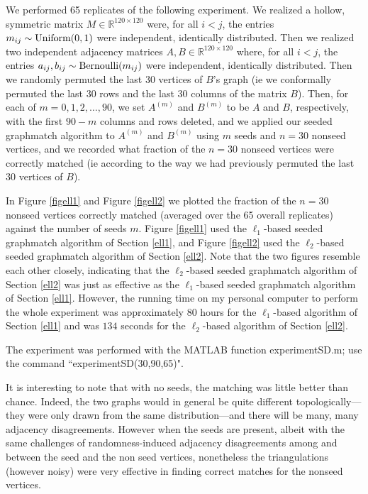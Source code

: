 \documentclass[12pt]{article}
\newcommand{\R}{\mathbb{R}}
\begin{document}
We performed 65 replicates of the following experiment.
We realized a hollow, symmetric matrix $M \in \R^{120 \times 120}$ were, for
all $i<j$, the entries $m_{ij}\sim \textup{Uniform}(0,1)$ were independent,
identically distributed.
Then we realized two independent adjacency matrices
$A,B \in \R^{120 \times 120}$
where, for all $i<j$, the entries $a_{ij},b_{ij}\sim
\textup{Bernoulli}(m_{ij})$ were
independent,
identically distributed. Then we randomly permuted the last
$30$ vertices of $B$'s graph (ie we conformally permuted the last 30 rows and the
last 30 columns of the matrix $B$). Then, for each of $m=0,1,2,\ldots,90$, we
set $A^{(m)}$ and $B^{(m)}$ to be $A$ and $B$, respectively, with
the first $90-m$ columns and rows deleted, and we applied our seeded graphmatch
algorithm to $A^{(m)}$ and $B^{(m)}$ using $m$ seeds and
$n=30$ nonseed vertices, and we recorded what fraction of the
$n=30$ nonseed vertices were correctly matched (ie according to the way
we had previously permuted the last 30 vertices of $B$).

In Figure \ref{figell1} and Figure \ref{figell2} we plotted  the fraction
of the $n=30$ nonseed vertices correctly matched (averaged over the 65
overall replicates) against the number of seeds $m$.
Figure \ref{figell1} used the
$\ell_1$-based seeded graphmatch algorithm of Section \ref{ell1}, and
Figure \ref{figell2} used the
$\ell_2$-based seeded graphmatch algorithm of Section \ref{ell2}. Note that
the two figures resemble each other closely, indicating that  the
$\ell_2$-based seeded graphmatch algorithm of Section \ref{ell2} was just as
effective as the
$\ell_1$-based seeded graphmatch algorithm of Section \ref{ell1}. However,
the running time on my personal computer to perform the whole experiment
was approximately 80 hours for the $\ell_1$-based algorithm of Section
\ref{ell1} and was $134$ seconds for the $\ell_2$-based algorithm of Section
\ref{ell2}.

The experiment was performed with the MATLAB function experimentSD.m;
use the command ``experimentSD(30,90,65)".

It is interesting to note that with no seeds, the matching was
little better than chance. Indeed, the two graphs would in general
be quite different topologically---they were only drawn from the
same distribution---and there will be many, many adjacency disagreements.
However when the seeds are present, albeit with the same challenges of
randomness-induced adjacency disagreements among and between the
seed and the non seed vertices, nonetheless the triangulations (however noisy)
were very effective in finding correct matches for the nonseed vertices.
\end{document}
